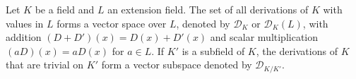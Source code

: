 Let $K$ be a field and $L$ an extension field. The set of all derivations of $K$ with values in $L$ forms a vector space over $L$, denoted by $\mathcal{D}_K$ or $\mathcal{D}_K(L)$, with addition $(D + D')(x) = D(x) + D'(x)$ and scalar multiplication $(aD)(x) = a D(x)$ for $a \in L$. If $K'$ is a subfield of $K$, the derivations of $K$ that are trivial on $K'$ form a vector subspace denoted by $\mathcal{D}_{K/K'}$.
